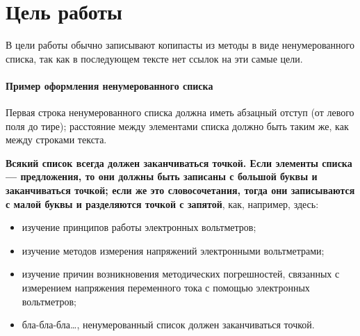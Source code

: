 \section{Цель работы}

В цели работы обычно записывают копипасты из методы в виде ненумерованного списка,
так как в последующем тексте нет ссылок на эти самые цели.

\paragraph{Пример оформления ненумерованного списка}
Первая строка ненумерованного списка должна иметь абзацный отступ (от левого поля до тире); 
расстояние между элементами списка должно быть таким же, как между строками текста.

\textbf{Всякий список всегда должен заканчиваться точкой. Если элементы списка --- 
предложения, то они должны быть записаны с большой буквы и заканчиваться точкой; если же это 
словосочетания, тогда они записываются с малой буквы и разделяются точкой с запятой}, как, например, здесь: 

\begin{itemize} 
\item изучение принципов работы электронных вольтметров;
\item изучение методов измерения напряжений электронными вольтметрами;
\item изучение причин возникновения методических погрешностей, связанных с измерением напряжения переменного тока с помощью электронных вольтметров;
\item бла-бла-бла\dots, ненумерованный список должен заканчиваться точкой.
\end{itemize}

\newpage